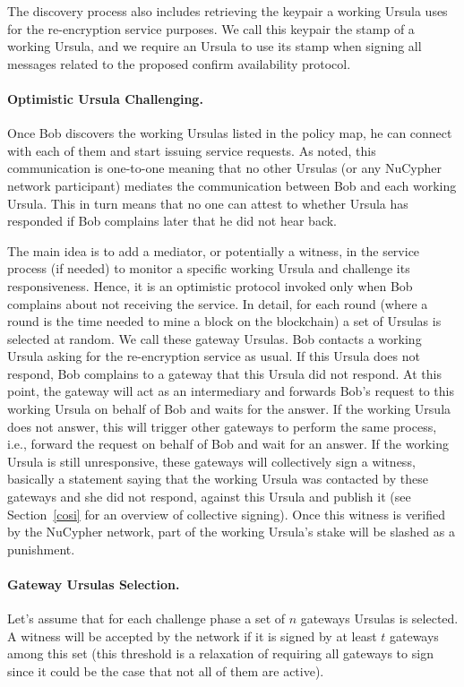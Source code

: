 The discovery process also includes retrieving the keypair a working Ursula uses for the re-encryption service purposes. We call this keypair the stamp of a working Ursula, and we require an Ursula to use its stamp when signing all messages related to the proposed confirm availability protocol. 


\paragraph{Optimistic Ursula Challenging.} Once Bob discovers the working Ursulas listed in the policy map, he can connect with each of them and start issuing service requests. As noted, this communication is one-to-one meaning that no other Ursulas (or any 
NuCypher network participant) mediates the communication between Bob and each working  
Ursula. This in turn means that no one can attest to whether Ursula has responded if Bob 
complains later that he did not hear back.


The main idea is to add a mediator, or potentially a witness, in the service process (if needed) to monitor 
a specific working Ursula and challenge its responsiveness. Hence, it is an optimistic protocol invoked 
only when Bob complains about not receiving the service. In detail, for each round (where a 
round is the time needed to mine a block on the blockchain) a set of Ursulas is selected at 
random. We call these gateway Ursulas. Bob contacts a working Ursula asking for the re-encryption service as usual. 
If this Ursula does not respond, Bob complains to a gateway that this Ursula 
did not respond. At this point, the gateway will act as an intermediary and forwards 
Bob's request to this working Ursula on behalf of Bob and waits for the answer. If the working 
Ursula does not answer, this will trigger other gateways to perform the same process, i.e., forward the request on behalf of Bob and wait for an answer. If the working 
Ursula is still unresponsive, these gateways will collectively sign a witness, basically a statement saying that the working Ursula was contacted by these gateways and she did not respond, against 
this Ursula and publish it (see Section~\ref{cosi} for an overview of collective signing). 
Once this witness is verified by the NuCypher network, 
part of the working Ursula's stake will be slashed as a punishment.


\paragraph{Gateway Ursulas Selection.} Let's assume that for each challenge phase a set of $n$ gateways Ursulas is selected. A witness will be accepted by the network if it is signed by at least $t$ gateways among this set (this threshold is a relaxation of requiring all gateways to sign since it could be the case that not all of them are active). 


